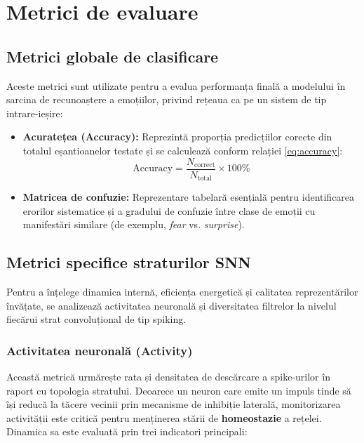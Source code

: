 \section{Metrici de evaluare}
\label{sec:metrici}

\subsection*{Metrici globale de clasificare}
Aceste metrici sunt utilizate pentru a evalua performanța finală a modelului în sarcina de recunoaștere a emoțiilor, privind rețeaua ca pe un sistem de tip intrare-ieșire:

\begin{itemize}
	\item \textbf{Acuratețea (Accuracy):} Reprezintă proporția predicțiilor corecte din totalul eșantioanelor testate și se calculează conform relației \eqref{eq:accuracy}:
	\begin{equation}
		\label{eq:accuracy}
		\text{Accuracy} = \frac{N_{\text{correct}}}{N_{\text{total}}} \times 100\%
	\end{equation}
	
	\item \textbf{Matricea de confuzie:} Reprezentare tabelară esențială pentru identificarea erorilor sistematice și a gradului de confuzie între clase de emoții cu manifestări similare (de exemplu, \textit{fear} vs. \textit{surprise}).
\end{itemize}

\subsection*{Metrici specifice straturilor SNN}
Pentru a înțelege dinamica internă, eficiența energetică și calitatea reprezentărilor învățate, se analizează activitatea neuronală și diversitatea filtrelor la nivelul fiecărui strat convoluțional de tip spiking.

\subsubsection{Activitatea neuronală (Activity)}
Această metrică urmărește rata și densitatea de descărcare a spike-urilor în raport cu topologia stratului. Deoarece un neuron care emite un impuls tinde să își reducă la tăcere vecinii prin mecanisme de inhibiție laterală, monitorizarea activității este critică pentru menținerea stării de \textbf{homeostazie} a rețelei. Dinamica sa este evaluată prin trei indicatori principali:

